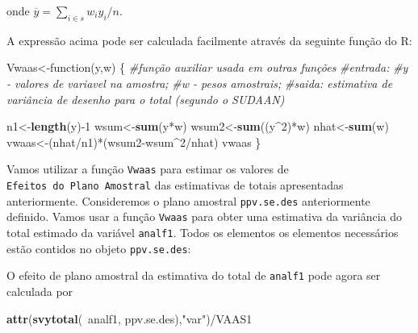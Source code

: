 \documentclass[]{book}
\newenvironment{Shaded}{\begin{snugshade}}{\end{snugshade}}
\newcommand{\KeywordTok}[1]{\textcolor[rgb]{0.13,0.29,0.53}{\textbf{{#1}}}}
\newcommand{\DecValTok}[1]{\textcolor[rgb]{0.00,0.00,0.81}{{#1}}}
\newcommand{\StringTok}[1]{\textcolor[rgb]{0.31,0.60,0.02}{{#1}}}
\newcommand{\CommentTok}[1]{\textcolor[rgb]{0.56,0.35,0.01}{\textit{{#1}}}}
\newcommand{\NormalTok}[1]{{#1}}
\theoremstyle{definition}
\theoremstyle{definition}
\theoremstyle{remark}
\begin{document}
onde \(\overline{y}=\sum_{i \in s}w_iy_i/n\).

A expressão acima pode ser calculada facilmente através da seguinte
função do R:

\begin{Shaded}
\begin{Highlighting}[]
\NormalTok{Vwaas<-function(y,w)}
\NormalTok{\{}
\CommentTok{#função auxiliar usada em outras funções}
\CommentTok{#entrada:}
\CommentTok{#y - valores de variavel na amostra;}
\CommentTok{#w - pesos amostrais;}
\CommentTok{#saida:  estimativa de variância de desenho para o total (segundo o SUDAAN)}

\NormalTok{n1<-}\KeywordTok{length}\NormalTok{(y)-}\DecValTok{1}
\NormalTok{wsum<-}\KeywordTok{sum}\NormalTok{(y*w)}
\NormalTok{wsum2<-}\KeywordTok{sum}\NormalTok{((y^}\DecValTok{2}\NormalTok{)*w)}
\NormalTok{nhat<-}\KeywordTok{sum}\NormalTok{(w)}
\NormalTok{vwaas<-(nhat/n1)*(wsum2-wsum^}\DecValTok{2}\NormalTok{/nhat)}
\NormalTok{vwaas}
\NormalTok{\}}
\end{Highlighting}
\end{Shaded}

Vamos utilizar a função \texttt{Vwaas} para estimar os valores de
\texttt{Efeitos\ do\ Plano\ Amostral} das estimativas de totais
apresentadas anteriormente. Consideremos o plano amostral
\texttt{ppv.se.des} anteriormente definido. Vamos usar a função
\texttt{Vwaas} para obter uma estimativa da variância do total estimado
da variável \texttt{analf1}. Todos os elementos os elementos necessários
estão contidos no objeto \texttt{ppv.se.des}:

\begin{Shaded}
\end{Shaded}

O efeito de plano amostral da estimativa do total de \texttt{analf1}
pode agora ser calculada por

\begin{Shaded}
\begin{Highlighting}[]
\KeywordTok{attr}\NormalTok{(}\KeywordTok{svytotal}\NormalTok{(~analf1, ppv.se.des),}\StringTok{"var"}\NormalTok{)/VAAS1}
\end{Highlighting}
\end{Shaded}
\end{document}
